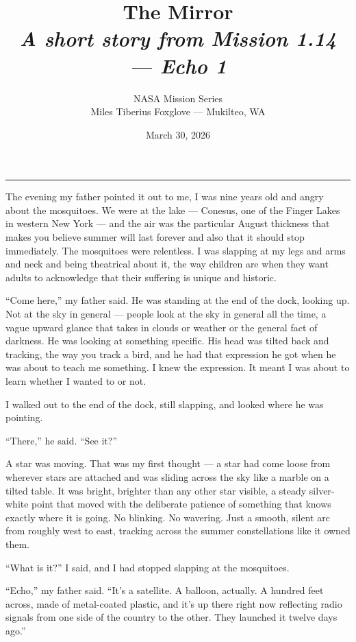 \documentclass[12pt, letterpaper]{article}
\title{\Huge\textbf{The Mirror}\\[0.5em]\large\textit{A short story from Mission 1.14 --- Echo 1}}
\author{NASA Mission Series\\[0.3em]\small Miles Tiberius Foxglove --- Mukilteo, WA}
\date{March 30, 2026}
\begin{document}
\maketitle
\thispagestyle{empty}

\vspace{1em}
\noindent\rule{\textwidth}{0.4pt}
\vspace{1em}

\noindent The evening my father pointed it out to me, I was nine years old and angry about the mosquitoes. We were at the lake --- Conesus, one of the Finger Lakes in western New York --- and the air was the particular August thickness that makes you believe summer will last forever and also that it should stop immediately. The mosquitoes were relentless. I was slapping at my legs and arms and neck and being theatrical about it, the way children are when they want adults to acknowledge that their suffering is unique and historic.

``Come here,'' my father said. He was standing at the end of the dock, looking up. Not at the sky in general --- people look at the sky in general all the time, a vague upward glance that takes in clouds or weather or the general fact of darkness. He was looking at something specific. His head was tilted back and tracking, the way you track a bird, and he had that expression he got when he was about to teach me something. I knew the expression. It meant I was about to learn whether I wanted to or not.

I walked out to the end of the dock, still slapping, and looked where he was pointing.

``There,'' he said. ``See it?''

A star was moving. That was my first thought --- a star had come loose from wherever stars are attached and was sliding across the sky like a marble on a tilted table. It was bright, brighter than any other star visible, a steady silver-white point that moved with the deliberate patience of something that knows exactly where it is going. No blinking. No wavering. Just a smooth, silent arc from roughly west to east, tracking across the summer constellations like it owned them.

``What is it?'' I said, and I had stopped slapping at the mosquitoes.

``Echo,'' my father said. ``It's a satellite. A balloon, actually. A hundred feet across, made of metal-coated plastic, and it's up there right now reflecting radio signals from one side of the country to the other. They launched it twelve days ago.''
\end{document}
